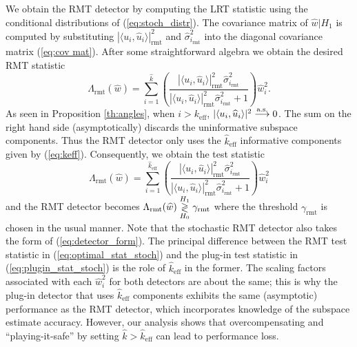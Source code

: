We obtain the RMT detector by computing the LRT statistic using the conditional distributions of (\ref{eq:stoch_distr}). The covariance matrix of $\widehat{w}|H_1$ is computed by substituting  $|\langle u_i,\widehat{u}_i\rangle|^2_\text{rmt}$ and $\widehat{\sigma}_{i_\text{rmt}}^2$ into the diagonal covariance matrix (\ref{eq:cov mat}). After some straightforward algebra we obtain the desired RMT statistic
\begin{equation*}
\Lambda_{\text{rmt}}(\widehat{w})= \sum_{i=1}^{\widehat{k}}\left(\frac{|\langle u_i,\widehat{u}_i\rangle|^2_{\text{rmt}}\widehat{\sigma}_{i_\text{rmt}}^2}{|\langle u_i,\widehat{u}_i\rangle|^2_{\text{rmt}}\widehat{\sigma}_{i_\text{rmt}}^2 + 1}\right)\widehat{w}_i^2.
\end{equation*}
As seen in Proposition \ref{th:angles}, when $i>k_\text{eff}$, $|\langle u_i,\widehat{u}_i\rangle|^2 \overset{\textrm{a.s.}}{\longrightarrow} 0$. The sum on the right hand side (asymptotically) discards the uninformative subspace components. Thus the RMT detector only uses the $\widehat{k}_{\text{eff}}$ informative components given by (\ref{eq:keff}). Consequently, we obtain the test statistic
\begin{equation}\label{eq:optimal_stat_stoch}
\boxed{\Lambda_{\text{rmt}}(\widehat{w})= \sum_{i=1}^{\widehat{k}_{\text{eff}}}\left(\frac{|\langle u_i,\widehat{u}_i\rangle|^2_{\text{rmt}}\widehat{\sigma}_{i_\text{rmt}}^2}{|\langle u_i,\widehat{u}_i\rangle|^2_{\text{rmt}}\widehat{\sigma}_{i_\text{rmt}}^2 + 1}\right)\widehat{w}_i^2}
\end{equation}
and the RMT detector becomes $\Lambda_{\text{rmt}}(\widehat{w}) \overset{H_1}{\underset{H_0}{\gtrless}} \gamma_{\text{rmt}}$
where the threshold $\gamma_{\text{rmt}}$ is chosen in the usual manner. Note that the stochastic RMT detector also takes the form of (\ref{eq:detector_form}). The principal difference between the RMT test statistic in (\ref{eq:optimal_stat_stoch}) and the plug-in test statistic in (\ref{eq:plugin_stat_stoch}) is the role of $\widehat{k}_{\text{eff}}$ in the former. The scaling factors associated with each $\widehat{w}_i^{2}$ for both detectors are about the same; this is why the plug-in detector that uses $\widehat{k}_{\text{eff}}$ components exhibits the same (asymptotic) performance as the RMT detector, which incorporates knowledge of the subspace estimate accuracy. However, our analysis shows that overcompensating and ``playing-it-safe'' by setting $\widehat{k}>\widehat{k}_{\text{eff}}$ can lead to performance loss.



